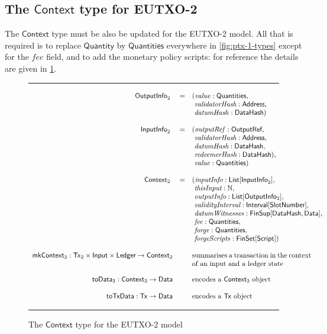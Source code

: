 \documentclass[a4paper]{article}
\renewcommand{\i}{\textit}  %
\newcommand{\s}{\textsf}  %
\newcommand{\msf}[1]{\ensuremath{\mathsf{#1}}}
\newcommand{\mi}[1]{\ensuremath{\mathit{#1}}}
\newcommand\rfskip{7pt}
\newenvironment{ruledfigure}[1]{\begin{figure}[#1]\hrule\vspace{\rfskip}}{\vspace{\rfskip}\hrule\end{figure}}
\newcommand{\List}[1]{\ensuremath{\s{List}[#1]}}
\newcommand{\FinSet}[1]{\ensuremath{\s{FinSet}[#1]}}
\newcommand{\Interval}[1]{\ensuremath{\s{Interval}[#1]}}
\newcommand{\FinSup}[2]{\ensuremath{\s{FinSup}[#1,#2]}}
\newcommand{\script}{\ensuremath{\s{Script}}}
\newcommand{\ctx}{\ensuremath{\s{Context}}}
\newcommand{\toData}{\ensuremath{\s{toData}}}
\newcommand{\toTxData}{\ensuremath{\s{toTxData}}}
\newcommand{\mkContext}{\ensuremath{\s{mkContext}}}
\newcommand{\Address}{\ensuremath{\s{Address}}}
\newcommand{\DataHash}{\ensuremath{\s{DataHash}}}
\newcommand{\forge}{\mi{forge}}
\newcommand{\forgeScripts}{\mi{forgeScripts}}
\newcommand{\fee}{\mi{fee}}
\newcommand{\val}{\mi{value}}  %
\newcommand{\datumHash}{\mi{datumHash}}
\newcommand{\datumWits}{\mi{datumWitnesses}}
\newcommand{\Data}{\ensuremath{\s{Data}}}
\newcommand{\outputref}{\mi{outputRef}}
\newcommand{\slotnum}{\ensuremath{\s{SlotNumber}}}
\newcommand{\eutxotx}{\msf{Tx}}
\newcommand{\qty}{\ensuremath{\s{Quantity}}}
\newcommand{\qtymap}{\ensuremath{\s{Quantities}}}
\newcommand\N{\ensuremath{\mathbb{N}}}
\begin{document}
\subsection{The \ctx{} type for EUTXO-2}
\label{sec:pendingtx-2}
The \ctx{} type must be also be updated for the EUTXO-2 model.  All
that is required is to replace \qty{} by \qtymap{} everywhere in
\cref{fig:ptx-1-types} except for the \fee{} field, and to add the
monetary policy scripts: for reference the details are given in
\cref{fig:ptx-2-types}.
\begin{ruledfigure}{H}
  \begin{displaymath}
  \begin{array}{rll}
    \s{OutputInfo}_2\s{ } &=&(\val: \qtymap,\\
                          & &\ \i{validatorHash}: \Address,\\
                          & &\ \datumHash: \DataHash)\\
    \\
    \s{InputInfo}_2\s{ } &=& (\outputref: \s{OutputRef},\\
                         & &\ \i{validatorHash}: \Address,\\
                         & &\ \i{datumHash}: \DataHash,\\
                         & &\ \i{redeemerHash}: \DataHash),\\
                         & &\ \val: \qtymap)\\
     \\
     \ctx_2\s{ } &=&(\i{inputInfo}: \List{\s{InputInfo}_2},\\
                 & &\ \i{thisInput}: \N,\\
                 & &\ \i{outputInfo}: \List{\s{OutputInfo$_2$}},\\
                 & &\ \i{validityInterval}: \Interval{\slotnum},\\
                 & &\ \datumWits: \FinSup{\DataHash}{\Data},\\
                 & &\ \fee: \qtymap,\\
                 & &\ \forge: \qtymap,\\
                 & &\ \forgeScripts: \FinSet{\script})\\
    \\
    \mkContext_2: \eutxotx_2 \times \s{Input} \times \s{Ledger} \rightarrow \ctx_2 &&
      \mbox{\parbox[t]{6cm}{summarises a transaction in the context of an input and a ledger state}}\\
     \\
     \toData_2: \ctx_2 \rightarrow \Data &~& \mbox{encodes a $\ctx_2$ object}\\
     \\
     \toTxData : \eutxotx \rightarrow \Data &~& \mbox{encodes a $\eutxotx$ object}
  \end{array}
  \end{displaymath}
  \caption{The \ctx{} type for the EUTXO-2 model}
  \label{fig:ptx-2-types}
\end{ruledfigure}
\end{document}
